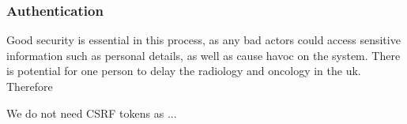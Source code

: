 \subsubsection{Authentication}
Good security is essential in this process, as any bad actors could access sensitive information such as personal details, as well as cause havoc on the system. There is potential for one person to delay the radiology and oncology in the uk. Therefore 

We do not need CSRF tokens as ...

\noindent
{}